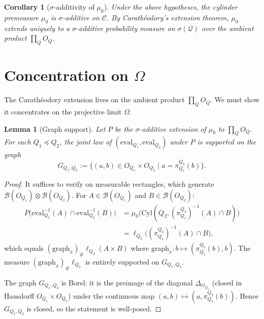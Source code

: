\documentclass[11pt]{article}
\newtheorem{lemma}{Lemma}
\newtheorem{corollary}{Corollary}
\theoremstyle{definition}
\newcommand{\Qcal}{\mathcal{Q}}
\newcommand{\Bcal}{\mathcal{B}}
\newcommand{\Ccal}{\mathcal{C}}
\begin{document}
\begin{corollary}[$\sigma$-additivity of $\mu_0$]
Under the above hypotheses, the cylinder premeasure $\mu_0$ is
$\sigma$-additive on $\Ccal$.  By Carath\'eodory's extension theorem,
$\mu_0$ extends uniquely to a $\sigma$-additive probability measure
on $\sigma(\Qcal)$ over the ambient product $\prod_Q O_Q$.
\end{corollary}

\section{Concentration on $\Omega$}\label{sec:concentration}

The Carath\'eodory extension lives on the ambient product
$\prod_Q O_Q$.  We must show it concentrates on the projective limit
$\Omega$.

\begin{lemma}[Graph support]
\label{lem:graph-support}
Let $P$ be the $\sigma$-additive extension of $\mu_0$ to
$\prod_Q O_Q$.  For each $Q_1 \preceq Q_2$, the joint law of
$(\mathrm{eval}_{Q_1}, \mathrm{eval}_{Q_2})$ under $P$ is supported
on the graph
\[
G_{Q_1,Q_2}
:=
\bigl\{
(a,b) \in O_{Q_1} \times O_{Q_2}
\;\big|\;
a = \pi^{Q_2}_{Q_1}(b)
\bigr\}.
\]
\end{lemma}

\begin{proof}
It suffices to verify on measurable rectangles, which generate
$\Bcal(O_{Q_1}) \otimes \Bcal(O_{Q_2})$.  For $A \in \Bcal(O_{Q_1})$
and $B \in \Bcal(O_{Q_2})$:
\begin{align*}
P\bigl(
\mathrm{eval}_{Q_1}^{-1}(A) \cap \mathrm{eval}_{Q_2}^{-1}(B)
\bigr)
&= \mu_0\bigl(\mathrm{Cyl}(Q_2, (\pi^{Q_2}_{Q_1})^{-1}(A) \cap B)\bigr) \\
&= \ell_{Q_2}\bigl((\pi^{Q_2}_{Q_1})^{-1}(A) \cap B\bigr),
\end{align*}
which equals $(\mathrm{graph}_\pi)_\# \ell_{Q_2}(A \times B)$
where $\mathrm{graph}_\pi : b \mapsto (\pi^{Q_2}_{Q_1}(b), b)$.
The measure $(\mathrm{graph}_\pi)_\# \ell_{Q_2}$ is entirely
supported on $G_{Q_1,Q_2}$.

The graph $G_{Q_1,Q_2}$ is Borel: it is the preimage of the diagonal
$\Delta_{O_{Q_1}}$ (closed in Hausdorff $O_{Q_1} \times O_{Q_1}$)
under the continuous map $(a,b) \mapsto (a, \pi^{Q_2}_{Q_1}(b))$.
Hence $G_{Q_1,Q_2}$ is closed, so the statement is well-posed.
\end{proof}
\end{document}
